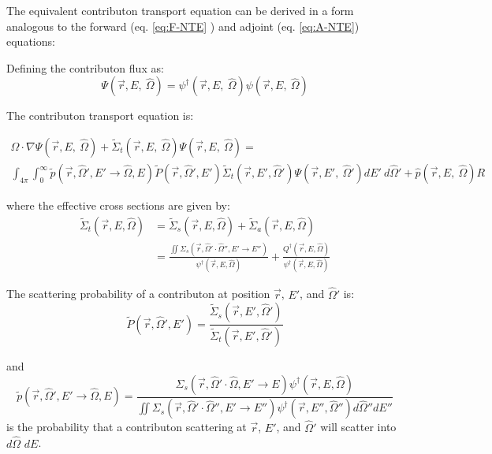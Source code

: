The equivalent contributon transport equation can be derived in a form analogous to the forward (eq. \ref{eq:F-NTE} ) and adjoint (eq. \ref{eq:A-NTE}) equations:

Defining the contributon flux as:
\begin{equation}
\Psi (\vec {r} ,E,\:\hat\Omega) = \psi^{\dagger} (\vec {r} ,E,\:\hat\Omega) \psi(\vec {r} ,E,\:\hat\Omega)
\end{equation}
\label{eq.Cont-Flux}

The contributon transport equation is:

\begin{multline}
\hat\Omega \cdot \nabla \Psi (\vec {r} ,E,\:\hat\Omega)
+\widetilde{\Sigma} _{ t }(\vec{r},E,\:\hat\Omega)\Psi (\vec { r } ,E,\:\hat\Omega) 
= \\ 
\int _{ 4\pi  } \int _{ 0 }^{ \infty  } 
\widetilde{p}(\vec{r}, \hat\Omega', E'\rightarrow\hat\Omega, E)
\widetilde{P}(\vec{r}, \hat\Omega',E')
\widetilde{\Sigma} _{ t }(\vec{r}, E', \hat\Omega')
\Psi (\vec { r } ,E',\: \hat\Omega')dE' \:d\hat\Omega' 
+ \hat p(\vec { r } ,E, \:\hat\Omega) R
\end{multline}
\label{eq:Cont-NTE}

where the effective cross sections are given by:
\begin{equation}
\begin{aligned}
\widetilde{\Sigma}_{t}(\vec{r}, E, \hat\Omega) &= \widetilde{\Sigma}_{s}(\vec{r}, E, \hat\Omega) + \widetilde{\Sigma}_{a}(\vec{r}, E, \hat\Omega) 
\\
&= \frac{\iint \Sigma_{s}(\vec{r},\hat\Omega'\cdot\hat\Omega'',E'\rightarrow E'')}
{\psi^{\dagger}(\vec{r}, E, \hat\Omega)}
+ \frac{Q^{\dagger}(\vec{r}, E, \hat\Omega)}{\psi^{\dagger}(\vec{r}, E, \hat\Omega)}
\end{aligned}
\end{equation}

The scattering probability of a contributon at position $\vec{r}$, $E'$, and $\hat\Omega'$ is:
\begin{equation}
\widetilde{P}(\vec{r}, \hat\Omega',E') = \frac{\widetilde{\Sigma} _{ s }(\vec{r}, E', \hat\Omega')}{\widetilde{\Sigma} _{ t }(\vec{r}, E', \hat\Omega')}
\end{equation}

and
\begin{equation}
\widetilde{p}(\vec{r}, \hat\Omega', E'\rightarrow\hat\Omega, E) =
\frac{\Sigma_{s}(\vec{r},\hat\Omega'\cdot\hat\Omega,E'\rightarrow E) \psi^{\dagger} (\vec{r}, E, \hat\Omega)}
{\iint \Sigma_{s}(\vec{r},\hat\Omega'\cdot\hat\Omega'',E'\rightarrow E'')\psi^{\dagger} (\vec{r}, E'', \hat\Omega'')d\hat\Omega'' dE''}
\end{equation}
is the probability that a contributon scattering at $\vec{r}$, $E'$, and $\hat\Omega'$ will scatter into $d\hat\Omega$ $dE$. 

